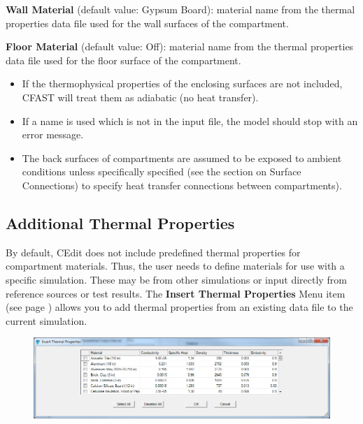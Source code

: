 \textbf{Wall Material} (default value: Gypsum Board): material name from the thermal properties data file used for the wall surfaces of the compartment.

\textbf{Floor Material} (default value: Off): material name from the thermal properties data file used for the floor surface of the compartment.

\begin{itemize}
\item If the thermophysical properties of the enclosing surfaces are not included, CFAST will treat them as adiabatic (no heat transfer).

\item If a name is used which is not in the input file, the model should stop with an error message.

\item The back surfaces of compartments are assumed to be exposed to ambient conditions unless specifically specified (see the section on Surface Connections) to specify heat transfer connections between compartments).
\end{itemize}

\subsection{Additional Thermal Properties}

By default, CEdit does not include predefined thermal properties for compartment materials. Thus, the user needs to define materials for use with a specific simulation.  These may be from other simulations or input directly from reference sources or test results. The \textbf{Insert Thermal Properties} Menu item (see page \pageref{Thermal_Properties_Menu}) allows you to add thermal properties from an existing data file to the current simulation.

\begin{figure}[h!]
\begin{center}
\includegraphics[width=6.5in]{FIGURES/Input_File/Insert_Thermal_Properties}
\end{center}
\end{figure}

